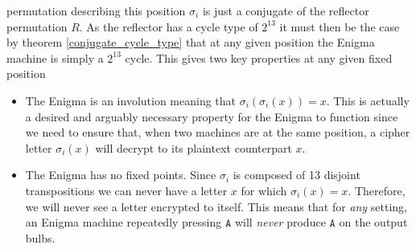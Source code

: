 permutation describing this position $\sigma_i$ is just a conjugate
of the reflector permutation $R$. As the reflector has a cycle type
of $2^{13}$ it must then be the case by theorem
\ref{conjugate_cycle_type} that at any given position the Enigma
machine is simply a $2^{13}$ cycle. This gives two key properties at
any given fixed position
\begin{itemize}
\item The Enigma is an involution meaning that $\sigma_i(\sigma_i(x))
= x$. This is actually a desired and arguably necessary property for
the Enigma to function since we need to ensure that, when two
machines are at the same position, a cipher letter $\sigma_i(x)$ will
decrypt to its plaintext counterpart $x$.
\item The Enigma has no fixed points. Since $\sigma_i$ is composed of
13 disjoint transpositions we can never have a letter $x$ for which
$\sigma_i(x) = x$. Therefore, we will never see a letter encrypted to
itself. This means that for \emph{any} setting, an Enigma machine
repeatedly pressing $\texttt{A}$ will \emph{never} produce
$\texttt{A}$ on the output bulbs.
\end{itemize}


